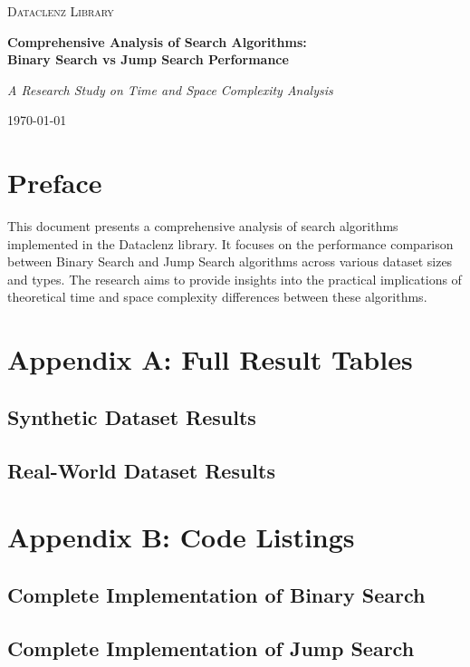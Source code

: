 \documentclass[12pt,a4paper]{report}
\begin{document}
\begin{titlepage}
    \centering
    \vspace*{1cm}
    {\scshape\LARGE Dataclenz Library \par}
    \vspace{1.5cm}
    {\huge\bfseries Comprehensive Analysis of Search Algorithms: \\ Binary Search vs Jump Search Performance \par}
    \vspace{2cm}
    {\Large\itshape A Research Study on Time and Space Complexity Analysis \par}
    \vfill
    {\large \today\par}
\end{titlepage}

\tableofcontents
\listoffigures
\listoftables

\chapter*{Preface}
This document presents a comprehensive analysis of search algorithms implemented in the Dataclenz library. It focuses on the performance comparison between Binary Search and Jump Search algorithms across various dataset sizes and types. The research aims to provide insights into the practical implications of theoretical time and space complexity differences between these algorithms.











\appendix
\chapter{Appendix A: Full Result Tables}
\section{Synthetic Dataset Results}

\section{Real-World Dataset Results}

\chapter{Appendix B: Code Listings}
\section{Complete Implementation of Binary Search}

\section{Complete Implementation of Jump Search}
\end{document}
